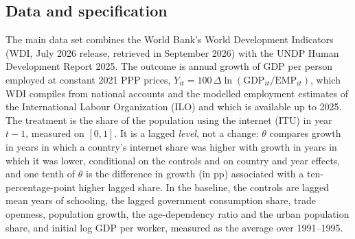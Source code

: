 \documentclass[preprint,12pt,authoryear]{elsarticle}
\begin{document}
\subsection{Data and specification}

The main data set combines the World Bank's World Development Indicators (WDI, July 2026 release, retrieved in September 2026) with the UNDP Human Development Report 2025. The outcome is annual growth of GDP per person employed at constant 2021 PPP prices, $Y_{it}=100\,\Delta\ln(\text{GDP}_{it}/\text{EMP}_{it})$, which WDI compiles from national accounts and the modelled employment estimates of the International Labour Organization (ILO) and which is available up to 2025. The treatment is the share of the population using the internet (ITU) in year $t-1$, measured on $[0,1]$. It is a lagged \emph{level}, not a change: $\theta$ compares growth in years in which a country's internet share was higher with growth in years in which it was lower, conditional on the controls and on country and year effects, and one tenth of $\theta$ is the difference in growth (in pp) associated with a ten-percentage-point higher lagged share. In the baseline, the controls are lagged mean years of schooling, the lagged government consumption share, trade openness, population growth, the age-dependency ratio and the urban population share, and initial log GDP per worker, measured as the average over 1991--1995.
\end{document}
